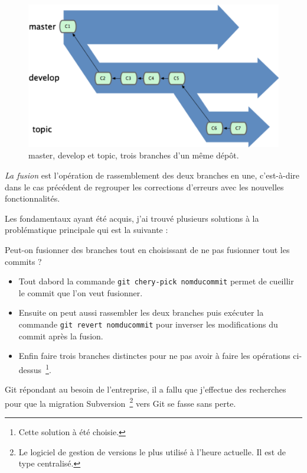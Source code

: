 \begin{figure}
\begin{center}
\includegraphics[scale=0.8]{images/branches.png}
\caption{master, develop et topic, trois branches d'un même dépôt.}
\label{branches}
\end{center}
\end{figure}

\emph{La fusion} est l'opération de rassemblement des deux branches en une,
c'est-à-dire dans le cas précédent de regrouper les corrections d'erreurs avec
les nouvelles fonctionnalités.

Les fondamentaux ayant été acquis, j'ai trouvé plusieurs solutions à la
problématique principale qui est la suivante : \newline

Peut-on fusionner des branches tout en choisissant de ne pas fusionner
tout les commits ? \newline

\begin{itemize}
    \item Tout dabord la commande \texttt{git chery-pick nomducommit} permet
    de \og cueillir \fg{} le commit que l'on veut fusionner.
    \item Ensuite on peut aussi rassembler les deux branches puis exécuter la
    commande \texttt{git revert nomducommit} pour inverser les modifications
    du commit après la fusion.
    \item Enfin faire trois branches distinctes pour ne pas avoir à faire les
    opérations ci-dessus\, \footnote{Cette solution à été choisie.}.
\end{itemize}

Git répondant au besoin de l'entreprise, il a fallu que j'effectue des
recherches pour que la migration Subversion\, \footnote{Le logiciel de gestion
de versions le plus utilisé à l'heure actuelle. Il est de type centralisé.}
vers Git se fasse sans perte.

